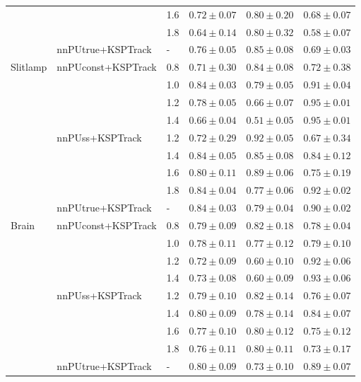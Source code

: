 \begin{table*}
\begin{tabular}{llp{1.8cm}p{1.8cm}p{1.8cm}p{1.8cm}}
      &                   & 1.6 &  $0.72\pm 0.07$ &  $0.80\pm 0.20$ &  $0.68\pm 0.07$ \\
      &                   & 1.8 &  $0.64\pm 0.14$ &  $0.80\pm 0.32$ &  $0.58\pm 0.07$ \\
\cline{2-6}
      & nnPUtrue+KSPTrack & - &  $0.76\pm 0.05$ &  $0.85\pm 0.08$ &  $0.69\pm 0.03$ \\
\cline{1-6}
\multirow{9}{*}{Slitlamp} & \multirow{4}{*}{nnPUconst+KSPTrack} & 0.8 &  $0.71\pm 0.30$ &  $0.84\pm 0.08$ &  $0.72\pm 0.38$ \\
      &                   & 1.0 &  $0.84\pm 0.03$ &  $0.79\pm 0.05$ &  $0.91\pm 0.04$ \\
      &                   & 1.2 &  $0.78\pm 0.05$ &  $0.66\pm 0.07$ &  $0.95\pm 0.01$ \\
      &                   & 1.4 &  $0.66\pm 0.04$ &  $0.51\pm 0.05$ &  $0.95\pm 0.01$ \\
\cline{2-6}
      & \multirow{4}{*}{nnPUss+KSPTrack} & 1.2 &  $0.72\pm 0.29$ &  $0.92\pm 0.05$ &  $0.67\pm 0.34$ \\
      &                   & 1.4 &  $0.84\pm 0.05$ &  $0.85\pm 0.08$ &  $0.84\pm 0.12$ \\
      &                   & 1.6 &  $0.80\pm 0.11$ &  $0.89\pm 0.06$ &  $0.75\pm 0.19$ \\
      &                   & 1.8 &  $0.84\pm 0.04$ &  $0.77\pm 0.06$ &  $0.92\pm 0.02$ \\
\cline{2-6}
      & nnPUtrue+KSPTrack & - &  $0.84\pm 0.03$ &  $0.79\pm 0.04$ &  $0.90\pm 0.02$ \\
\cline{1-6}
\multirow{9}{*}{Brain} & \multirow{4}{*}{nnPUconst+KSPTrack} & 0.8 &  $0.79\pm 0.09$ &  $0.82\pm 0.18$ &  $0.78\pm 0.04$ \\
      &                   & 1.0 &  $0.78\pm 0.11$ &  $0.77\pm 0.12$ &  $0.79\pm 0.10$ \\
      &                   & 1.2 &  $0.72\pm 0.09$ &  $0.60\pm 0.10$ &  $0.92\pm 0.06$ \\
      &                   & 1.4 &  $0.73\pm 0.08$ &  $0.60\pm 0.09$ &  $0.93\pm 0.06$ \\
\cline{2-6}
      & \multirow{4}{*}{nnPUss+KSPTrack} & 1.2 &  $0.79\pm 0.10$ &  $0.82\pm 0.14$ &  $0.76\pm 0.07$ \\
      &                   & 1.4 &  $0.80\pm 0.09$ &  $0.78\pm 0.14$ &  $0.84\pm 0.07$ \\
      &                   & 1.6 &  $0.77\pm 0.10$ &  $0.80\pm 0.12$ &  $0.75\pm 0.12$ \\
      &                   & 1.8 &  $0.76\pm 0.11$ &  $0.80\pm 0.11$ &  $0.73\pm 0.17$ \\
\cline{2-6}
      & nnPUtrue+KSPTrack & - &  $0.80\pm 0.09$ &  $0.73\pm 0.10$ &  $0.89\pm 0.07$ \\
\bottomrule
\end{tabular}
\end{table*}
